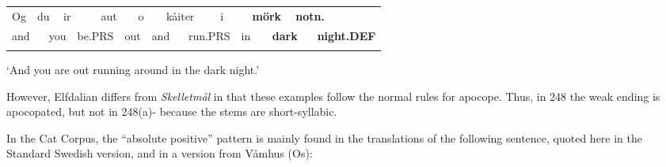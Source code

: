 \begin{tabular}{llllllllllllllllll}
\lsptoprule
Og & \multicolumn{2}{l}{du

} & \multicolumn{2}{l}{ir

} & \multicolumn{2}{l}{aut

} & \multicolumn{2}{l}{o

} & \multicolumn{2}{l}{kåiter

} & \multicolumn{2}{l}{i

} & \multicolumn{2}{l}{{\bfseries mörk}

} & \multicolumn{2}{l}{{\bfseries notn.}

} & \\
\multicolumn{2}{l}{and

} & \multicolumn{2}{l}{you

} & \multicolumn{2}{l}{be.PRS

} & \multicolumn{2}{l}{out

} & \multicolumn{2}{l}{and

} & \multicolumn{2}{l}{run.PRS

} & \multicolumn{2}{l}{in

} & \multicolumn{2}{l}{{\bfseries dark}

} & \multicolumn{2}{l}{{\bfseries night.DEF}

}\\
\lspbottomrule
\end{tabular}

\begin{styleTranslation}
‘And you are out running around in the dark night.’

\end{styleTranslation}

\begin{styleBodyTextFirst}
However, Elfdalian differs from \textit{Skelletmål} in that these examples follow the normal rules for apocope. Thus, in 248 the weak ending is apocopated, but not in 248(a){}- because the stems are short-syllabic.

\end{styleBodyTextFirst}

\begin{styleBodytextC}
In the Cat Corpus, the “absolute positive” pattern is mainly found in the translations of the following sentence, quoted here in the Standard Swedish version, and in a version from Våmhus (Os):

\end{styleBodytextC}


